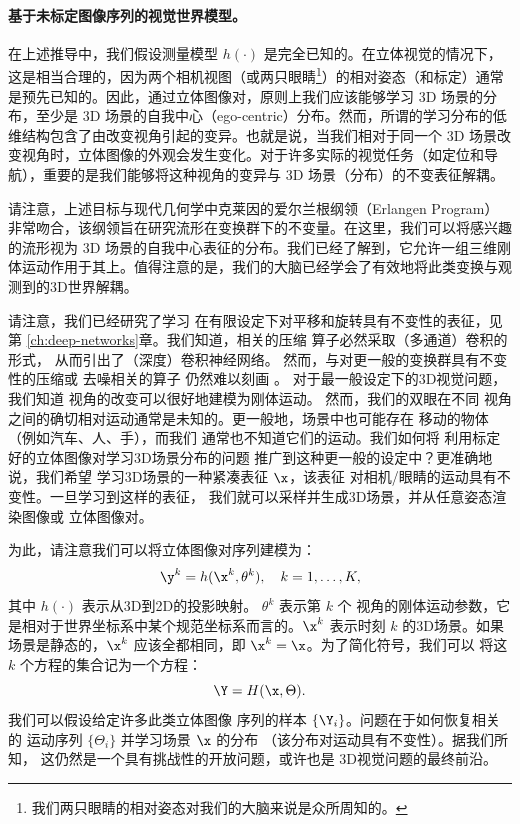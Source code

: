 \documentclass[../../book-main_zh.tex]{subfiles}
\begin{document}
\paragraph{基于未标定图像序列的视觉世界模型。}

在上述推导中，我们假设测量模型 $h(\cdot)$ 是完全已知的。在立体视觉的情况下，这是相当合理的，因为两个相机视图（或两只眼睛\footnote{我们两只眼睛的相对姿态对我们的大脑来说是众所周知的。}）的相对姿态（和标定）通常是预先已知的。因此，通过立体图像对，原则上我们应该能够学习 3D 场景的分布，至少是 3D 场景的自我中心（ego-centric）分布。然而，所谓的学习分布的低维结构包含了由改变视角引起的变异。也就是说，当我们相对于同一个 3D 场景改变视角时，立体图像的外观会发生变化。对于许多实际的视觉任务（如定位和导航），重要的是我们能够将这种视角的变异与 3D 场景（分布）的不变表征解耦。

\begin{remark}请注意，上述目标与现代几何学中克莱因的爱尔兰根纲领（Erlangen Program）非常吻合，该纲领旨在研究流形在变换群下的不变量。在这里，我们可以将感兴趣的流形视为 3D 场景的自我中心表征的分布。我们已经了解到，它允许一组三维刚体运动作用于其上。值得注意的是，我们的大脑已经学会了有效地将此类变换与观测到的3D世界解耦。
\end{remark}

请注意，我们已经研究了学习
在有限设定下对平移和旋转具有不变性的表征，见第
\ref{ch:deep-networks}章。我们知道，相关的压缩
算子必然采取（多通道）卷积的形式，
从而引出了（深度）卷积神经网络。
然而，与对更一般的变换群具有不变性的压缩或
去噪相关的算子
仍然难以刻画 \cite{cohen2016group}。
对于最一般设定下的3D视觉问题，我们知道
视角的改变可以很好地建模为刚体运动。
然而，我们的双眼在不同
视角之间的确切相对运动通常是未知的。更一般地，场景中也可能存在
移动的物体（例如汽车、人、手），而我们
通常也不知道它们的运动。我们如何将
利用标定好的立体图像对学习3D场景分布的问题
推广到这种更一般的设定中？更准确地说，我们希望
学习3D场景的一种紧凑表征 $\x$，该表征
对相机/眼睛的运动具有不变性。一旦学习到这样的表征，
我们就可以采样并生成3D场景，并从任意姿态渲染图像或
立体图像对。

为此，请注意我们可以将立体图像对序列建模为：
\begin{equation}
    \y^k = h(\x^k, \theta^k), \quad k=1, \ldots, K,
\end{equation}
其中 $h(\cdot)$ 表示从3D到2D的投影映射。
$\theta^k$ 表示第 $k$ 个
视角的刚体运动参数，它是相对于世界坐标系中某个规范坐标系而言的。$\x^k$
表示时刻 $k$ 的3D场景。如果场景是静态的，$\x^k$
应该全都相同，即 $\x^k = \x$。为了简化符号，我们可以
将这 $k$ 个方程的集合记为一个方程：
\begin{equation}
    \Y = H(\x,\Theta).
\end{equation}
我们可以假设给定许多此类立体图像
序列的样本 $\{\Y_i\}$。问题在于如何恢复相关的
运动序列 $\{\Theta_i\}$ 并学习场景 $\x$ 的分布
（该分布对运动具有不变性）。据我们所知，
这仍然是一个具有挑战性的开放问题，或许也是
3D视觉问题的最终前沿。
\end{document}
